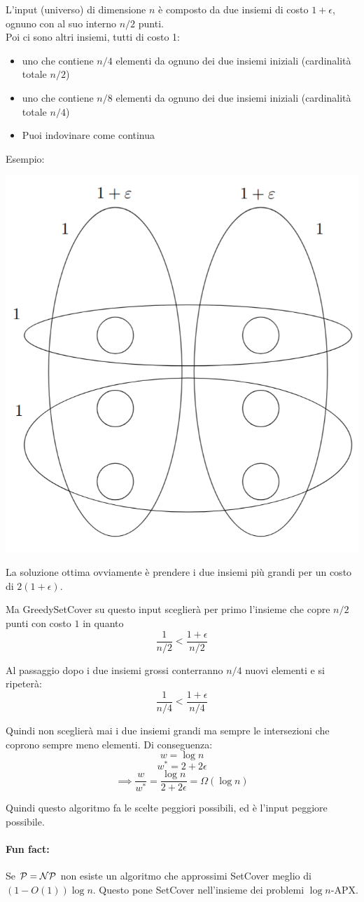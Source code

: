 L'input (universo) di dimensione $n$ è composto da due insiemi di costo $1 + \epsilon$, ognuno con al suo interno $n/2$ punti. \\
Poi ci sono altri insiemi, tutti di costo 1:
\begin{itemize}
	\item uno che contiene $n/4$ elementi da ognuno dei due insiemi iniziali (cardinalità totale $n/2$)
	\item uno che contiene $n/8$ elementi da ognuno dei due insiemi iniziali (cardinalità totale $n/4$)
	\item Puoi indovinare come continua
\end{itemize}
Esempio:

\begin{center}
	\includegraphics[width=0.5\columnwidth]{img/VertexCoverInput}
\end{center}

La soluzione ottima ovviamente è prendere i due insiemi più grandi per un costo di $2(1 + \epsilon)$.\\

\newpage

Ma GreedySetCover su questo input sceglierà per primo l'insieme che copre $n/2$ punti con costo $1$ in quanto 
$$ \frac{1}{n/2} < \frac{1+\epsilon}{n/2} $$

Al passaggio dopo i due insiemi grossi conterranno $n/4$ nuovi elementi e si ripeterà:
$$ \frac{1}{n/4} < \frac{1+\epsilon}{n/4} $$

Quindi non sceglierà mai i due insiemi grandi ma sempre le intersezioni che coprono sempre meno elementi. Di conseguenza:
$$ w = \log n $$
$$ w^\ast = 2 + 2 \epsilon$$
$$ \implies \frac{w}{w^\ast} = \frac{\log n}{2 + 2 \epsilon} = \Omega (\log n)$$

Quindi questo algoritmo fa le scelte peggiori possibili, ed è l'input peggiore possibile.\\

\paragraph{Fun fact:} Se $\mathcal{P} = \mathcal{NP}$ non esiste un algoritmo che approssimi SetCover meglio di $(1 - O(1)) \log n$. Questo pone SetCover nell'insieme dei problemi $\log n$-APX.\\

\newpage